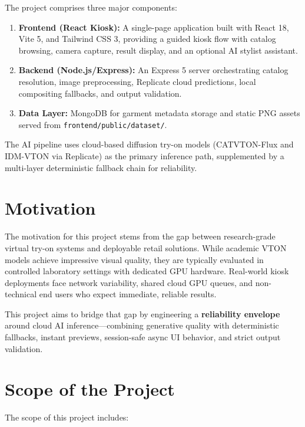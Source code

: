 The project comprises three major components:

\begin{enumerate}[leftmargin=*]
  \item \textbf{Frontend (React Kiosk):} A single-page application built with React 18, Vite 5, and Tailwind CSS 3, providing a guided kiosk flow with catalog browsing, camera capture, result display, and an optional AI stylist assistant.
  \item \textbf{Backend (Node.js/Express):} An Express 5 server orchestrating catalog resolution, image preprocessing, Replicate cloud predictions, local compositing fallbacks, and output validation.
  \item \textbf{Data Layer:} MongoDB for garment metadata storage and static PNG assets served from \texttt{frontend/public/dataset/}.
\end{enumerate}

The AI pipeline uses cloud-based diffusion try-on models (CATVTON-Flux and IDM-VTON via Replicate) as the primary inference path, supplemented by a multi-layer deterministic fallback chain for reliability.

\section{Motivation}
\label{sec:motivation}

The motivation for this project stems from the gap between research-grade virtual try-on systems and deployable retail solutions. While academic VTON models achieve impressive visual quality, they are typically evaluated in controlled laboratory settings with dedicated GPU hardware. Real-world kiosk deployments face network variability, shared cloud GPU queues, and non-technical end users who expect immediate, reliable results.

This project aims to bridge that gap by engineering a \textbf{reliability envelope} around cloud AI inference---combining generative quality with deterministic fallbacks, instant previews, session-safe async UI behavior, and strict output validation.

\section{Scope of the Project}
\label{sec:scope}

The scope of this project includes:

